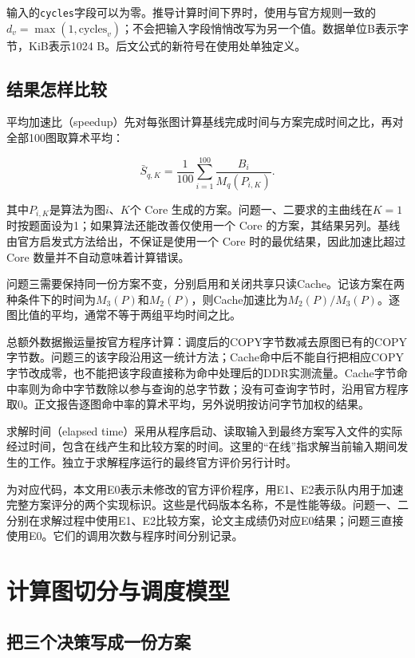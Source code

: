 \documentclass[anonymous,notoc]{gmcm2026}
\begin{document}
输入的\texttt{cycles}字段可以为零。推导计算时间下界时，使用与官方规则一致的\(d_v=\max(1,\mathrm{cycles}_v)\)；不会把输入字段悄悄改写为另一个值。数据单位B表示字节，KiB表示1024 B。后文公式的新符号在使用处单独定义。

\subsection{结果怎样比较}

平均加速比（speedup）先对每张图计算基线完成时间与方案完成时间之比，再对全部100图取算术平均：

\[\bar S_{q,K}=\frac1{100}\sum_{i=1}^{100}\frac{B_i}{M_q(P_{i,K})}.\]

其中\(P_{i,K}\)是算法为图\(i\)、\(K\)个 Core 生成的方案。问题一、二要求的主曲线在\(K=1\)时按题面设为1；如果算法还能改善仅使用一个 Core 的方案，其结果另列。基线由官方启发式方法给出，不保证是使用一个 Core 时的最优结果，因此加速比超过 Core 数量并不自动意味着计算错误。

问题三需要保持同一份方案不变，分别启用和关闭共享只读Cache。记该方案在两种条件下的时间为\(M_3(P)\)和\(M_2(P)\)，则Cache加速比为\(M_2(P)/M_3(P)\)。逐图比值的平均，通常不等于两组平均时间之比。

总额外数据搬运量按官方程序计算：调度后的COPY字节数减去原图已有的COPY字节数。问题三的该字段沿用这一统计方法；Cache命中后不能自行把相应COPY字节改成零，也不能把该字段直接称为命中处理后的DDR实测流量。Cache字节命中率则为命中字节数除以参与查询的总字节数；没有可查询字节时，沿用官方程序取0。正文报告逐图命中率的算术平均，另外说明按访问字节加权的结果。

求解时间（elapsed time）采用从程序启动、读取输入到最终方案写入文件的实际经过时间，包含在线产生和比较方案的时间。这里的``在线''指求解当前输入期间发生的工作。独立于求解程序运行的最终官方评价另行计时。

为对应代码，本文用E0表示未修改的官方评价程序，用E1、E2表示队内用于加速完整方案评分的两个实现标识。这些是代码版本名称，不是性能等级。问题一、二分别在求解过程中使用E1、E2比较方案，论文主成绩仍对应E0结果；问题三直接使用E0。它们的调用次数与程序时间分别记录。


\section{计算图切分与调度模型}

\subsection{把三个决策写成一份方案}
\end{document}
